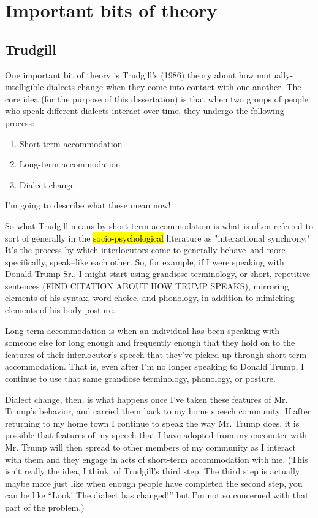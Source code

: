\section{Important bits of theory}
\label{sec:theory}
\subsection{Trudgill}
One important bit of theory is Trudgill's (1986) theory about how mutually-intelligible dialects change when they come into contact with one another. The core idea (for the purpose of this dissertation) is that when two groups of people who speak different dialects interact over time, they undergo the following process:
\begin{enumerate}
\item Short-term accommodation
\item Long-term accommodation
\item Dialect change
\end{enumerate}
I'm going to describe what these mean now!

So what Trudgill means by short-term accommodation is what is often referred to sort of generally in the \hl{socio-psychological} literature as "interactional synchrony." It's the process by which interlocutors come to generally behave--and more specifically, speak--like each other. So, for example, if I were speaking with Donald Trump Sr., I might start using grandiose terminology, or short, repetitive sentences (FIND CITATION ABOUT HOW TRUMP SPEAKS), mirroring elements of his syntax, word choice, and phonology, in addition to mimicking elements of his body posture.

Long-term accommodation is when an individual has been speaking with someone else for long enough and frequently enough that they hold on to the features of their interlocutor's speech that they've picked up through short-term accommodation. That is, even after I'm no longer speaking to Donald Trump, I continue to use that same grandiose terminology, phonology, or posture.

Dialect change, then, is what happens once I've taken these features of Mr. Trump's behavior, and carried them back to my home speech community. If after returning to my home town I continue to speak the way Mr. Trump does, it is possible that features of my speech that I have adopted from my encounter with Mr. Trump will then spread to other members of my community as I interact with them and they engage in acts of short-term accommodation with me. (This isn't really the idea, I think, of Trudgill's third step. The third step is actually maybe more just like when enough people have completed the second step, you can be like ``Look! The dialect has changed!'' but I'm not so concerned with that part of the problem.)

